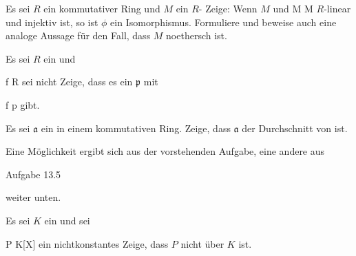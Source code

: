{}
{





Es sei $R$ ein kommutativer Ring und $M$ ein
$R$-
Zeige: Wenn $M$
und
\maabb {\phi} { M } { M
} {}
$R$-linear und injektiv ist, so ist $\phi$ ein Isomorphismus. Formuliere und beweise auch eine analoge Aussage für den Fall, dass $M$ noethersch ist.





}
{} {}

{}
{





Es sei $R$ ein
und

\mavergleichskette
{\vergleichskette
{ f
}
{ \in }{ R
}
{  }{
}
{    }{
}
{   }{
}
}
{}{}{}
sei nicht
Zeige, dass es ein
${\mathfrak p}$ mit

\mavergleichskette
{\vergleichskette
{ f
}
{ \notin }{ {\mathfrak p}
}
{  }{
}
{    }{
}
{   }{
}
}
{}{}{}
gibt.





}
{} {}

{}
{





Es sei $\mathfrak a$ ein 
in einem kommutativen Ring.
Zeige, dass $\mathfrak a$ der Durchschnitt von
ist.





}
{} {Eine Möglichkeit ergibt sich aus der vorstehenden Aufgabe, eine andere aus

Aufgabe 13.5

weiter unten.}

{}
{





Es sei $K$ ein
 und sei

\mavergleichskette
{\vergleichskette
{ P
}
{ \in }{ K[X]
}
{  }{
}
{    }{
}
{   }{
}
}
{}{}{}
ein nichtkonstantes
Zeige, dass $P$ nicht
über $K$ ist.





}
{} {}

